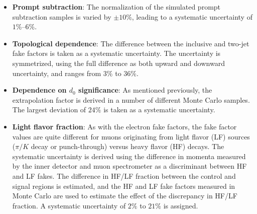 \begin{itemize}
  \item \textbf{Prompt subtraction}: The normalization of the simulated prompt subtraction samples is varied by $\pm10\%$, leading to a systematic uncertainty of $1\%$--$6\%$.
  \item \textbf{Topological dependence}: The difference between the inclusive and two-jet fake factors is taken as a systematic uncertainty. The uncertainty is symmetrized, using the full difference as both upward and downward uncertainty, and ranges from $3\%$ to $36\%$. 
  \item \textbf{Dependence on $d_0$ significance}: As mentioned previously, the extrapolation factor is derived in a number of different Monte Carlo samples. The largest deviation of $24\%$ is taken as a systematic uncertainty.
  \item \textbf{Light flavor fraction}: As with the electron fake factors, the fake factor values are quite different for muons originating from light flavor (LF) sources ($\pi/K$ decay or punch-through) versus heavy flavor (HF) decays. The systematic uncertainty is derived using the difference in momenta measured by the inner detector and muon spectrometer as a discriminant between HF and LF fakes.  The difference in HF/LF fraction between the control and signal regions is estimated, and the HF and LF fake factors measured in Monte Carlo are used to estimate the effect of the discrepancy in HF/LF fraction. A systematic uncertainty of $2\%$ to $21\%$ is assigned. 
\end{itemize}


